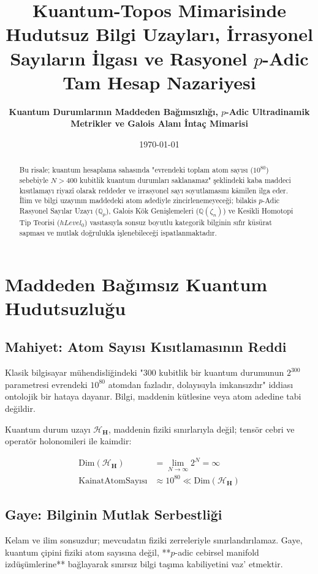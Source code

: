 \documentclass[11pt, a4paper]{article}
\title{\textbf{Kuantum-Topos Mimarisinde Hudutsuz Bilgi Uzayları, İrrasyonel Sayıların İlgası ve Rasyonel $p$-Adic Tam Hesap Nazariyesi}}
\author{\textbf{Kuantum Durumlarının Maddeden Bağımsızlığı, $p$-Adic Ultradinamik Metrikler ve Galois Alanı İntaç Mimarisi}}
\date{\today}
\begin{document}
\maketitle

\begin{abstract}
Bu risale; kuantum hesaplama sahasında "evrendeki toplam atom sayısı ($10^{80}$) sebebiyle $N > 400$ kubitlik kuantum durumları saklanamaz" şeklindeki kaba maddeci kısıtlamayı riyazî olarak reddeder ve irrasyonel sayı soyutlamasını kâmilen ilga eder. İlim ve bilgi uzayının maddedeki atom adediyle zincirlenemeyeceği; bilakis $p$-Adic Rasyonel Sayılar Uzayı ($\mathbb{Q}_p$), Galois Kök Genişlemeleri ($\mathbb{Q}(\zeta_n)$) ve Kesikli Homotopi Tip Teorisi ($hLevel_0$) vasıtasıyla sonsuz boyutlu kategorik bilginin sıfır küsürat sapması ve mutlak doğrulukla işlenebileceği ispatlanmaktadır.
\end{abstract}

\tableofcontents
\newpage

\section{Maddeden Bağımsız Kuantum Hudutsuzluğu}

\subsection{Mahiyet: Atom Sayısı Kısıtlamasının Reddi}
Klasik bilgisayar mühendisliğindeki "300 kubitlik bir kuantum durumunun $2^{300}$ parametresi evrendeki $10^{80}$ atomdan fazladır, dolayısıyla imkansızdır" iddiası ontolojik bir hataya dayanır. Bilgi, maddenin kütlesine veya atom adedine tabi değildir. 

Kuantum durum uzayı $\mathcal{H}_{\mathbf{H}}$, maddenin fiziki sınırlarıyla değil; tensör cebri ve operatör holonomileri ile kaimdir:

\begin{align}
\text{Dim}(\mathcal{H}_{\mathbf{H}}) &= \lim_{N \to \infty} 2^N = \infty \\
\text{KainatAtomSayısı} &\approx 10^{80} \ll \text{Dim}(\mathcal{H}_{\mathbf{H}})
\end{align}

\subsection{Gaye: Bilginin Mutlak Serbestliği}
Kelam ve ilim sonsuzdur; mevcudatın fiziki zerreleriyle sınırlandırılamaz. Gaye, kuantum çipini fiziki atom sayısına değil, **$p$-adic cebirsel manifold izdüşümlerine** bağlayarak sınırsız bilgi taşıma kabiliyetini vaz' etmektir.
\end{document}

